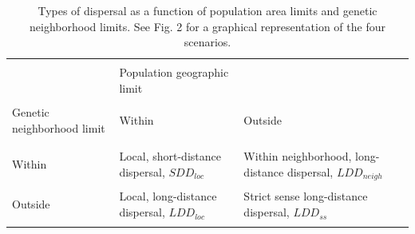 \documentclass[a4paper, 12pt]{article}
\begin{document}
\pagestyle{empty}
\begin{landscape}
	\headheight     3cm
\begin{table}
\captionsetup{width=20cm}%
\caption{Types of dispersal as a function of population area limits and genetic neighborhood limits. See Fig. 2 for a graphical representation of the four scenarios.}
\vspace{0.5cm}
  \begin{tabular}{lll}
    \hline
\\&Population geographic limit    &  \\\\
Genetic neighborhood limit     &Within &Outside \\\\
    \hline
\\Within    &  Local, short-distance \linebreak dispersal, $SDD_{loc}$  
          &  Within neighborhood, \linebreak long-distance dispersal, $LDD_{neigh}$ \\\\
Outside   &     Local, long-distance \linebreak dispersal, $LDD_{loc}$    
          &  Strict sense \linebreak long-distance dispersal, $LDD_{ss}$\\\\ 
    \hline
  \end{tabular}
\end{table}
\end{landscape}


\newpage

\end{document}
